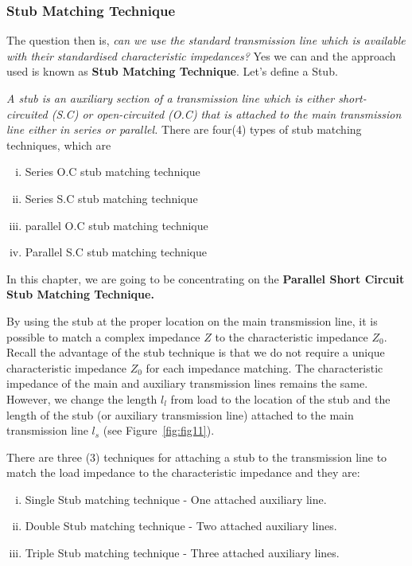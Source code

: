 \subsubsection{Stub Matching Technique}
The question then is, \emph{can we use the standard transmission line which is available with their standardised characteristic impedances?} Yes we can and the approach used is known as \textbf{Stub Matching Technique}. Let's define a Stub.

\emph{A stub is an auxiliary section of a transmission line which is either short-circuited (S.C) or open-circuited (O.C) that is attached to the main transmission line either in series or parallel.} There are four(4) types of stub matching techniques, which are
\begin{enumerate}[(i)]
\item Series O.C stub matching technique
\item Series S.C stub matching technique
\item parallel O.C stub matching technique
\item Parallel S.C stub matching technique
\end{enumerate}
In this chapter, we are going to be concentrating on the \textbf{Parallel Short Circuit Stub Matching Technique.}

By using the stub at the proper location on the main transmission line, it is possible to match a complex impedance $Z$ to the characteristic impedance $Z_0$.
Recall the advantage of the stub technique is that we do not require a unique characteristic impedance $Z_0$ for each impedance matching. The characteristic impedance of the main and auxiliary transmission lines remains the same. However, we change the length $l_l$ from load to the location of the stub and the length of the stub (or auxiliary transmission line) attached to the main transmission line $l_s$ (see Figure~\ref{fig:fig11}).

There are three (3) techniques for attaching a stub to the transmission line to match the load impedance to the characteristic impedance and they are:
\begin{enumerate}[(i)]
\item Single Stub matching technique - One attached auxiliary line.
\item Double Stub matching technique - Two attached auxiliary lines.
\item Triple Stub matching technique - Three attached auxiliary lines.
\end{enumerate}

